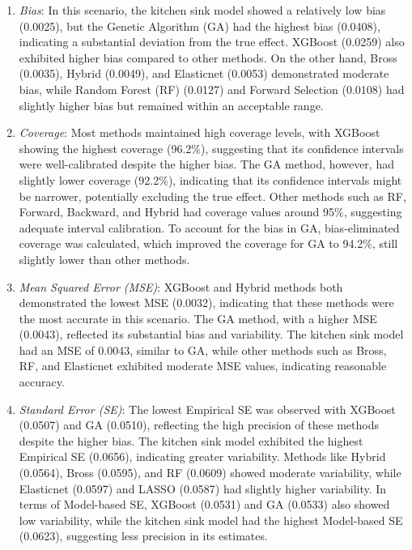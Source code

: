 \documentclass[sn-vancouver,Numbered,lineno,pdflatex]{sn-jnl}
\begin{document}
\begin{enumerate}
\def\labelenumi{\arabic{enumi}.}
\item
  \emph{Bias}: In this scenario, the kitchen sink model showed a
  relatively low bias (0.0025), but the Genetic Algorithm (GA) had the
  highest bias (0.0408), indicating a substantial deviation from the
  true effect. XGBoost (0.0259) also exhibited higher bias compared to
  other methods. On the other hand, Bross (0.0035), Hybrid (0.0049), and
  Elasticnet (0.0053) demonstrated moderate bias, while Random Forest
  (RF) (0.0127) and Forward Selection (0.0108) had slightly higher bias
  but remained within an acceptable range.
\item
  \emph{Coverage}: Most methods maintained high coverage levels, with
  XGBoost showing the highest coverage (96.2\(\%\)), suggesting that its
  confidence intervals were well-calibrated despite the higher bias. The
  GA method, however, had slightly lower coverage (92.2\(\%\)),
  indicating that its confidence intervals might be narrower,
  potentially excluding the true effect. Other methods such as RF,
  Forward, Backward, and Hybrid had coverage values around 95\(\%\),
  suggesting adequate interval calibration. To account for the bias in
  GA, bias-eliminated coverage was calculated, which improved the
  coverage for GA to 94.2\(\%\), still slightly lower than other
  methods.
\item
  \emph{Mean Squared Error (MSE)}: XGBoost and Hybrid methods both
  demonstrated the lowest MSE (0.0032), indicating that these methods
  were the most accurate in this scenario. The GA method, with a higher
  MSE (0.0043), reflected its substantial bias and variability. The
  kitchen sink model had an MSE of 0.0043, similar to GA, while other
  methods such as Bross, RF, and Elasticnet exhibited moderate MSE
  values, indicating reasonable accuracy.
\item
  \emph{Standard Error (SE)}: The lowest Empirical SE was observed with
  XGBoost (0.0507) and GA (0.0510), reflecting the high precision of
  these methods despite the higher bias. The kitchen sink model
  exhibited the highest Empirical SE (0.0656), indicating greater
  variability. Methods like Hybrid (0.0564), Bross (0.0595), and RF
  (0.0609) showed moderate variability, while Elasticnet (0.0597) and
  LASSO (0.0587) had slightly higher variability. In terms of
  Model-based SE, XGBoost (0.0531) and GA (0.0533) also showed low
  variability, while the kitchen sink model had the highest Model-based
  SE (0.0623), suggesting less precision in its estimates.
\end{enumerate}
\end{document}
